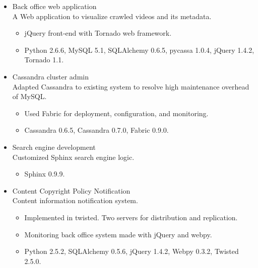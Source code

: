 \documentclass[line,margin]{res}
\begin{document}
\begin{resume}
\begin{itemize}
                     \item Back office web application \\ A Web application to visualize crawled videos and its metadata.
                     \begin{itemize}
                         \item jQuery front-end with Tornado web framework.
                         \item Python 2.6.6, MySQL 5.1, SQLAlchemy 0.6.5, pycassa 1.0.4, jQuery 1.4.2, Tornado 1.1.
                     \end{itemize}
    
                     \item Cassandra cluster admin \\ Adapted Cassandra to existing system
                                                      to resolve high maintenance overhead of MySQL.
                     \begin{itemize}
                         \item Used Fabric for deployment, configuration, and monitoring.
                         \item Cassandra 0.6.5, Cassandra 0.7.0, Fabric 0.9.0.
                     \end{itemize}

                     \item  Search engine development \\ Customized Sphinx search engine logic.
                     \begin{itemize}
                         \item Sphinx 0.9.9.
                     \end{itemize}

                     \item Content Copyright Policy Notification \\ Content information notification system.
                     \begin{itemize}
                         \item Implemented in twisted. Two servers for distribution and replication.
                         \item Monitoring back office system made with jQuery and webpy.
                         \item Python 2.5.2, SQLAlchemy 0.5.6, jQuery 1.4.2, Webpy 0.3.2, Twisted 2.5.0.
                     \end{itemize}


\end{itemize}
\end{resume}
\end{document}
